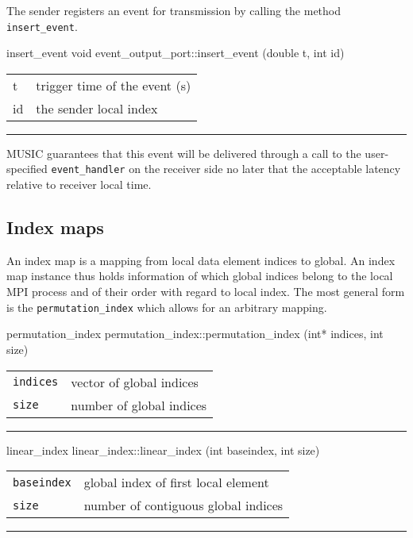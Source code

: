 \documentclass[a4paper]{report}
\makeatletter
\newenvironment{parameters}%
{\begin{tabular}{@{\hspace{2em}}lp{0.6\textwidth}}}%
{\end{tabular}\par\vspace{1mm}\par\hrule\par\vspace{5mm}}
\makeatother
\begin{document}
The sender registers an event for transmission by calling the method
\lstinline|insert_event|.

\begin{head}{insert_event}
  void event_output_port::insert_event (double t, int id)
\end{head}
\begin{parameters}
  t & trigger time of the event (s) \\
  id & the sender local index \\
\end{parameters}

MUSIC guarantees that this event will be delivered through a call to
the user-specified \lstinline|event_handler| on the receiver side no
later that the acceptable latency relative to receiver local time.

\subsection{Index maps}

An index map is a mapping from local data element indices to
global. An index map instance thus holds information of which global
indices belong to the local MPI process and of their order with regard
to local index.  The most general form is the
\lstinline|permutation_index| which allows for an arbitrary mapping.

\begin{head}{permutation_index}
  permutation_index::permutation_index (int* indices,
                                        int size)
\end{head}
\begin{parameters}
  \lstinline|indices| & vector of global indices \\
  \lstinline|size| & number of global indices \\
\end{parameters}

\begin{head}{linear_index}
  linear_index::linear_index (int baseindex, int size)
\end{head}
\begin{parameters}
  \lstinline|baseindex| & global index of first local element \\
  \lstinline|size| & number of contiguous global indices \\
\end{parameters}
\end{document}
